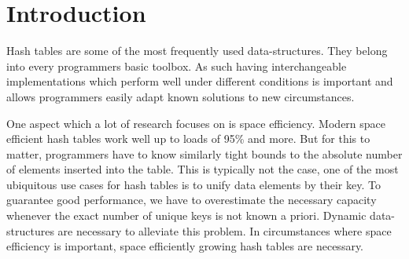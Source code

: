 \documentclass[a4paper,UKenglish]{lipics-v2016}
\begin{document}

\section{Introduction}
Hash tables are some of the most frequently used data-structures. They
belong into every programmers basic toolbox.  As such having
interchangeable implementations which perform well under different
conditions is important and allows programmers
easily adapt known solutions to new circumstances.

One aspect which a lot of research focuses on is space efficiency.
Modern space efficient hash tables work well up to loads of 95\% and
more. But for this to matter, programmers have to know similarly tight
bounds to the absolute number of elements inserted into the table.
This is typically not the case, one of the most ubiquitous use cases
for hash tables is to unify data elements by their key.  To
guarantee good performance, we have to overestimate the necessary
capacity whenever the exact number of unique keys is not known a
priori.  Dynamic data-structures are necessary to alleviate this
problem.  In circumstances where space efficiency is important, space
efficiently growing hash tables are necessary.
\end{document}
